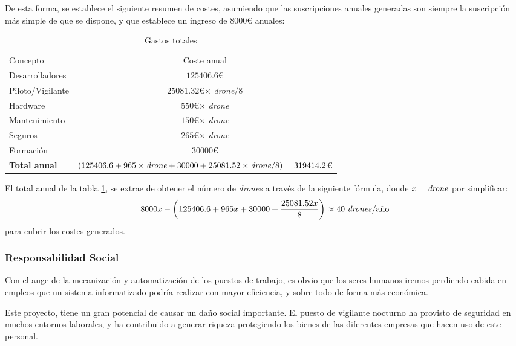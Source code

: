 De esta forma, se establece el siguiente resumen de costes, asumiendo que las suscripciones anuales generadas son siempre la suscripción más simple de que se dispone, y que establece un ingreso de $8000$\euro{} anuales: 

\begin{table}
	\begin{center}
		\begin{tabular}{l  c}\hline
			\toprule
			Concepto & Coste anual\\
			\otoprule
			Desarrolladores & $125406.6$\euro\\
			Piloto/Vigilante & $25081.32$\euro $\times$ \emph{drone}/8 \\ 
			Hardware   & $550$\euro $\times$ \emph{drone}\\
			Mantenimiento & $150$\euro $\times$ \emph{drone}\\
			Seguros & $265$\euro $\times$ \emph{drone}\\
			Formación & $30000$\euro \\
			\hline
			\textbf{Total anual} & $(125406.6 + 965 \times \emph{drone} + 30000 + 25081.52 \times \emph{drone}/8) = 319414.2$\euro\\
			\bottomrule
		\end{tabular}
		\caption{Gastos totales}
		\label{tb:gastosTotalesEq}
	\end{center}
\end{table}

El total anual de la tabla \ref{tb:gastosTotalesEq}, se extrae de obtener el número de \emph{drones} a través de la siguiente fórmula, donde $x=\text{\emph{drone}}$ por simplificar: 
\begin{equation}
8000x - \left(125406.6 + 965x + 30000 + \frac{25081.52x}{8}\right) \approx 40 \text{ \emph{drones}/año}
\end{equation}
 para cubrir los costes generados.


\subsubsection{Responsabilidad Social}
\label{subsec:respSocial}
Con el auge de la mecanización y automatización de los puestos de trabajo, es obvio que los seres humanos iremos perdiendo cabida en empleos que un sistema informatizado podría realizar con mayor eficiencia, y sobre todo de forma más económica. 

Este proyecto, tiene un gran potencial de causar un daño social importante. El puesto de vigilante nocturno ha provisto de seguridad en muchos entornos laborales, y ha contribuido a generar riqueza protegiendo los bienes de las diferentes empresas que hacen uso de este personal.


